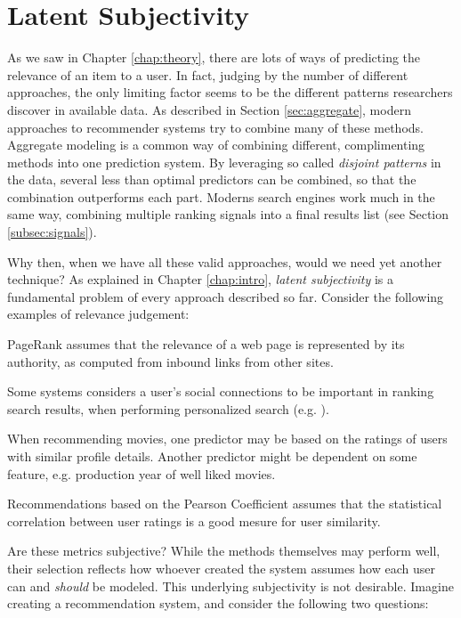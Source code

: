\section{Latent Subjectivity}
\label{sec:reasoning}

As we saw in Chapter \ref{chap:theory}, 
there are lots of ways of predicting the
relevance of an item to a user. 
In fact, judging by the number of different approaches,
the only limiting factor seems to be the different 
patterns researchers discover in available data.
As described in Section \ref{sec:aggregate},
modern approaches to recommender systems try to combine many of these methods.
Aggregate modeling is a common way of combining different, complimenting
methods into one prediction system.
By leveraging so called \emph{disjoint patterns}
in the data, several less than optimal predictors
can be combined, so that the combination outperforms each part.
Moderns search engines work much in the same way,
combining multiple ranking signals into a final results list
(see Section \ref{subsec:signals}).

Why then, when we have all these valid approaches, would we need yet another technique?
As explained in Chapter \ref{chap:intro}, \emph{latent subjectivity}
is a fundamental problem of every approach described so far.
Consider the following examples of relevance judgement:

\begin{itemize*}
  \item PageRank \citep{Bender2005} assumes that the relevance of a web page is 
  represented by its authority, as computed from inbound links from other sites.
  \item Some systems considers a user's social connections to be important
  in ranking search results, when performing personalized search (e.g. \cite{Carmel2009}).
  \item When recommending movies, one predictor may be based on the ratings
  of users with similar profile details. Another predictor might be 
  dependent on some feature, e.g. production year of well liked movies.
  \item Recommendations based on the Pearson Coefficient \cite[p11]{Segaran2007}
  assumes that the statistical correlation between user ratings is a good
  mesure for user similarity.
\end{itemize*}

Are these metrics subjective? 
While the methods themselves may perform well, their selection
reflects how whoever created the system assumes how each user
can and \emph{should} be modeled. This underlying subjectivity is not desirable.
Imagine creating a recommendation system, and consider the following two questions:

